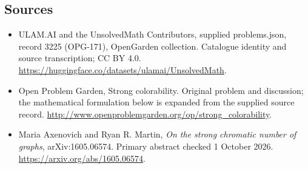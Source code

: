 \documentclass[11pt,a4paper]{article}
\begin{document}
\subsection{Sources}
\begin{itemize}
\item[S1] ULAM.AI and the UnsolvedMath Contributors, supplied problems.json, record 3225 (OPG-171), OpenGarden collection. Catalogue identity and source transcription; CC BY 4.0.
\url{https://huggingface.co/datasets/ulamai/UnsolvedMath}.
\item[S2] Open Problem Garden, Strong colorability. Original problem and discussion; the mathematical formulation below is expanded from the supplied source record.
\url{http://www.openproblemgarden.org/op/strong_colorability}.
\item[R1] Maria Axenovich and Ryan R. Martin, \emph{On the strong
chromatic number of graphs}, arXiv:1605.06574. Primary abstract checked
1 October 2026. \url{https://arxiv.org/abs/1605.06574}.
\end{itemize}
\end{document}
